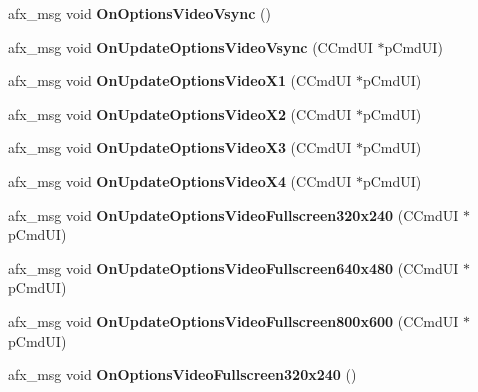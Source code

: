 \begin{DoxyCompactItemize}
\mbox{\label{class_main_wnd_ad539bc63bc7704f4aa66e3a75a39826b}} 
afx\+\_\+msg void {\bfseries On\+Options\+Video\+Vsync} ()
\item 
\mbox{\label{class_main_wnd_a62d2c4008242d583674336b144f82bbd}} 
afx\+\_\+msg void {\bfseries On\+Update\+Options\+Video\+Vsync} (C\+Cmd\+UI $\ast$p\+Cmd\+UI)
\item 
\mbox{\label{class_main_wnd_a74d2c1b8649f464fc5995638a22aabae}} 
afx\+\_\+msg void {\bfseries On\+Update\+Options\+Video\+X1} (C\+Cmd\+UI $\ast$p\+Cmd\+UI)
\item 
\mbox{\label{class_main_wnd_a8577839827a8f6684675feb1820dae88}} 
afx\+\_\+msg void {\bfseries On\+Update\+Options\+Video\+X2} (C\+Cmd\+UI $\ast$p\+Cmd\+UI)
\item 
\mbox{\label{class_main_wnd_aa6cb4b2f08200d2df0ead57a7d008ad9}} 
afx\+\_\+msg void {\bfseries On\+Update\+Options\+Video\+X3} (C\+Cmd\+UI $\ast$p\+Cmd\+UI)
\item 
\mbox{\label{class_main_wnd_a3605271418d3f68bc60293ee699d6917}} 
afx\+\_\+msg void {\bfseries On\+Update\+Options\+Video\+X4} (C\+Cmd\+UI $\ast$p\+Cmd\+UI)
\item 
\mbox{\label{class_main_wnd_afa6d29afbce490545bac5c87e99d18e6}} 
afx\+\_\+msg void {\bfseries On\+Update\+Options\+Video\+Fullscreen320x240} (C\+Cmd\+UI $\ast$p\+Cmd\+UI)
\item 
\mbox{\label{class_main_wnd_a464b9ea581a489b94f09f6729041b62c}} 
afx\+\_\+msg void {\bfseries On\+Update\+Options\+Video\+Fullscreen640x480} (C\+Cmd\+UI $\ast$p\+Cmd\+UI)
\item 
\mbox{\label{class_main_wnd_ac7f87e2d41aa1674be4489729c87526c}} 
afx\+\_\+msg void {\bfseries On\+Update\+Options\+Video\+Fullscreen800x600} (C\+Cmd\+UI $\ast$p\+Cmd\+UI)
\item 
\mbox{\label{class_main_wnd_a6cdf116ca046f531f38d3d4ecb506f93}} 
afx\+\_\+msg void {\bfseries On\+Options\+Video\+Fullscreen320x240} ()
\item 

\end{DoxyCompactItemize}
